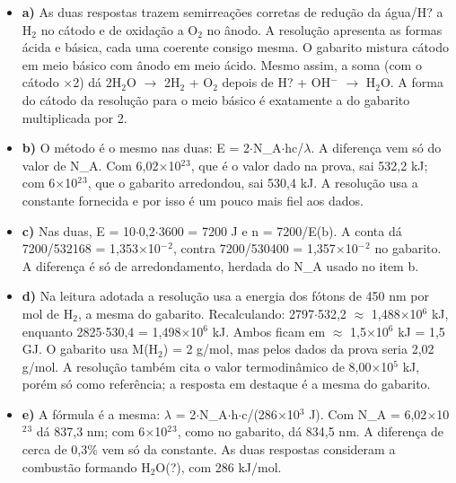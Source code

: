 \documentclass{article}%
\begin{document}
\begin{itemize}%
\item%
\textbf{a)} As duas respostas trazem semirreações corretas de redução da água/H? a H$_{2}$ no cátodo e de oxidação a O$_{2}$ no ânodo. A resolução apresenta as formas ácida e básica, cada uma coerente consigo mesma. O gabarito mistura cátodo em meio básico com ânodo em meio ácido. Mesmo assim, a soma (com o cátodo $\times$2) dá 2H$_{2}$O $\to$ 2H$_{2}$ + O$_{2}$ depois de H? + OH$^{-}$ $\to$ H$_{2}$O. A forma do cátodo da resolução para o meio básico é exatamente a do gabarito multiplicada por 2.%
\item%
\textbf{b)} O método é o mesmo nas duas: E = 2$\cdot$N\_A$\cdot$hc/$\lambda$. A diferença vem só do valor de N\_A. Com 6,02$\times$10$^2$$^3$, que é o valor dado na prova, sai 532,2 kJ; com 6$\times$10$^2$$^3$, que o gabarito arredondou, sai 530,4 kJ. A resolução usa a constante fornecida e por isso é um pouco mais fiel aos dados.%
\item%
\textbf{c)} Nas duas, E = 10$\cdot$0,2$\cdot$3600 = 7200 J e n = 7200/E(b). A conta dá 7200/532168 = 1,353$\times$10$^{-}$$^2$, contra 7200/530400 = 1,357$\times$10$^{-}$$^2$ no gabarito. A diferença é só de arredondamento, herdada do N\_A usado no item b.%
\item%
\textbf{d)} Na leitura adotada a resolução usa a energia dos fótons de 450 nm por mol de H$_{2}$, a mesma do gabarito. Recalculando: 2797$\cdot$532,2 $\approx$ 1,488$\times$10$^{6}$ kJ, enquanto 2825$\cdot$530,4 = 1,498$\times$10$^{6}$ kJ. Ambos ficam em $\approx$ 1,5$\times$10$^{6}$ kJ = 1,5 GJ. O gabarito usa M(H$_{2}$) = 2 g/mol, mas pelos dados da prova seria 2,02 g/mol. A resolução também cita o valor termodinâmico de 8,00$\times$10$^{5}$ kJ, porém só como referência; a resposta em destaque é a mesma do gabarito.%
\item%
\textbf{e)} A fórmula é a mesma: $\lambda$ = 2$\cdot$N\_A$\cdot$h$\cdot$c/(286$\times$10$^3$ J). Com N\_A = 6,02$\times$10$^2$$^3$ dá 837,3 nm; com 6$\times$10$^2$$^3$, como no gabarito, dá 834,5 nm. A diferença de cerca de 0,3\% vem só da constante. As duas respostas consideram a combustão formando H$_{2}$O(?), com 286 kJ/mol.%
\end{itemize}%
\end{document}
